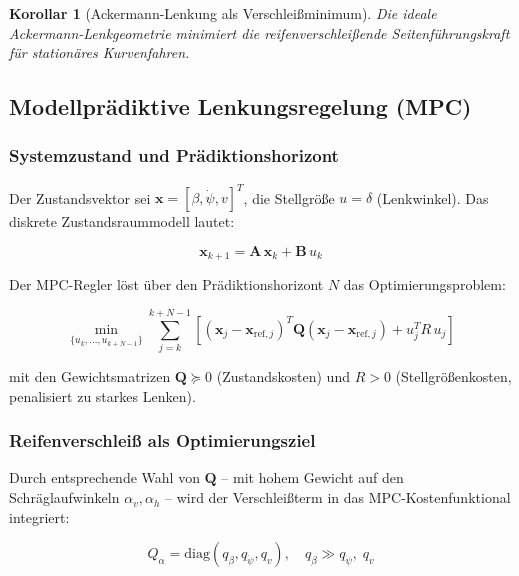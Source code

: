 ﻿\documentclass[12pt,a4paper]{article}
\newtheorem{corollary}[theorem]{Korollar}
\theoremstyle{definition}
\theoremstyle{remark}
\begin{document}
\begin{corollary}[Ackermann-Lenkung als Verschleißminimum]
Die ideale Ackermann-Lenkgeometrie minimiert die reifenverschleißende
Seitenführungskraft für stationäres Kurvenfahren.
\end{corollary}

\subsection{Modellprädiktive Lenkungsregelung (MPC)}

\subsubsection{Systemzustand und Prädiktionshorizont}

Der Zustandsvektor sei $\mathbf{x} = [\beta, \dot{\psi}, v]^T$, die Stellgröße
$u = \delta$ (Lenkwinkel). Das diskrete Zustandsraummodell lautet:

\begin{equation}
  \mathbf{x}_{k+1} = \mathbf{A}\,\mathbf{x}_k + \mathbf{B}\,u_k
  \label{eq:state_space}
\end{equation}

Der MPC-Regler löst über den Prädiktionshorizont $N$ das Optimierungsproblem:

\begin{equation}
  \min_{\{u_k, \ldots, u_{k+N-1}\}} \sum_{j=k}^{k+N-1}
    \left[(\mathbf{x}_j - \mathbf{x}_{\mathrm{ref},j})^T \mathbf{Q}
    (\mathbf{x}_j - \mathbf{x}_{\mathrm{ref},j}) + u_j^T R\, u_j\right]
  \label{eq:mpc}
\end{equation}

mit den Gewichtsmatrizen $\mathbf{Q} \succeq 0$ (Zustandskosten) und
$R > 0$ (Stellgrößenkosten, penalisiert zu starkes Lenken).

\subsubsection{Reifenverschleiß als Optimierungsziel}

Durch entsprechende Wahl von $\mathbf{Q}$ -- mit hohem Gewicht auf den
Schräglaufwinkeln $\alpha_v, \alpha_h$ -- wird der Verschleißterm in das
MPC-Kostenfunktional integriert:

\begin{equation}
  Q_{\alpha} = \text{diag}(q_\beta, q_{\dot\psi}, q_v), \quad
  q_\beta \gg q_{\dot\psi},\; q_v
  \label{eq:q_weights}
\end{equation}
\end{document}
